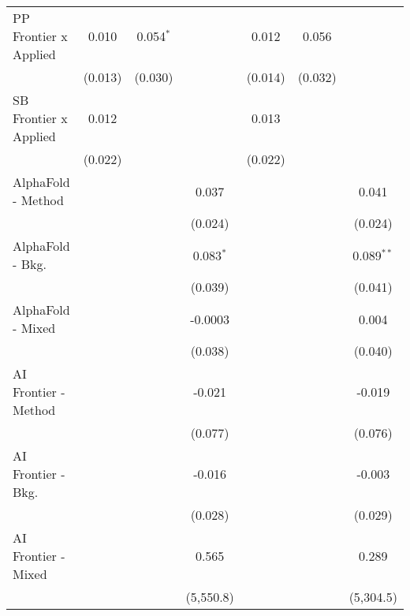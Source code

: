 \begin{tabular}{lcccccc}
   PP Frontier x Applied          & 0.010          & 0.054$^{*}$  &             & 0.012          & 0.056        &   \\   
                                  & (0.013)        & (0.030)      &             & (0.014)        & (0.032)      &   \\   
   SB Frontier x Applied          & 0.012          &              &             & 0.013          &              &   \\   
                                  & (0.022)        &              &             & (0.022)        &              &   \\   
   AlphaFold - Method             &                &              & 0.037       &                &              & 0.041\\   
                                  &                &              & (0.024)     &                &              & (0.024)\\   
   AlphaFold - Bkg.               &                &              & 0.083$^{*}$ &                &              & 0.089$^{**}$\\   
                                  &                &              & (0.039)     &                &              & (0.041)\\   
   AlphaFold - Mixed              &                &              & -0.0003     &                &              & 0.004\\   
                                  &                &              & (0.038)     &                &              & (0.040)\\   
   AI Frontier - Method           &                &              & -0.021      &                &              & -0.019\\   
                                  &                &              & (0.077)     &                &              & (0.076)\\   
   AI Frontier - Bkg.             &                &              & -0.016      &                &              & -0.003\\   
                                  &                &              & (0.028)     &                &              & (0.029)\\   
   AI Frontier - Mixed            &                &              & 0.565       &                &              & 0.289\\   
                                  &                &              & (5,550.8)   &                &              & (5,304.5)\\   

\end{tabular}
